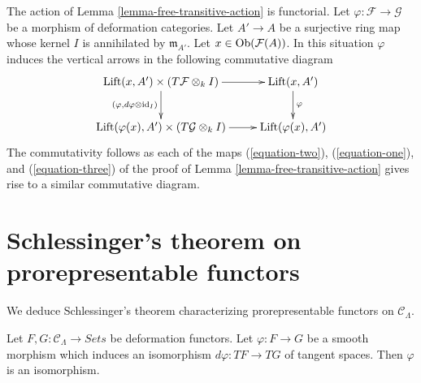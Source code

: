 \begin{remark}
\label{remark-free-transitive-action-functorial}
The action of Lemma \ref{lemma-free-transitive-action} is functorial.
Let $\varphi: \mathcal{F} \to \mathcal{G}$ be a morphism of deformation
categories. Let $A' \to A$ be a surjective ring map whose kernel $I$
is annihilated by $\mathfrak m_{A'}$. Let
$x \in \mathop{\rm Ob}\nolimits(\mathcal{F}(A))$.
In this situation $\varphi$ induces the vertical arrows
in the following commutative diagram
$$
\xymatrix{
\text{Lift}(x, A') \times (T\mathcal{F} \otimes_k I)
\ar[d]_{(\varphi, d\varphi \otimes \text{id}_I)} \ar[r] &
\text{Lift}(x, A') \ar[d]^\varphi \\
\text{Lift}(\varphi(x), A') \times (T\mathcal{G} \otimes_k I) \ar[r] &
\text{Lift}(\varphi(x), A')
}
$$
The commutativity follows as each of the maps
(\ref{equation-two}), (\ref{equation-one}), and (\ref{equation-three})
of the proof of
Lemma \ref{lemma-free-transitive-action}
gives rise to a similar commutative diagram.
\end{remark}






\section{Schlessinger's theorem on prorepresentable functors}
\label{section-schlessingers-theorem}

\noindent
We deduce Schlessinger's theorem characterizing prorepresentable functors on
$\mathcal{C}_\Lambda$.

\begin{lemma}
\label{lemma-minimal-smooth-morphism-functors}
Let $F, G: \mathcal{C}_\Lambda \to \textit{Sets}$ be deformation
functors. Let $\varphi : F \to G$ be a smooth morphism which induces
an isomorphism $d\varphi : TF \to TG$ of tangent
spaces. Then $\varphi$ is an isomorphism.
\end{lemma}

